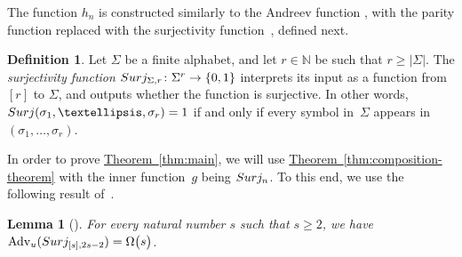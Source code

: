 \documentclass[11pt]{article}
\numberwithin{equation}{section}
\newtheorem{lemma}[theorem]{Lemma}
\theoremstyle{definition}
\newtheorem{definition}[theorem]{Definition}
\theoremstyle{plain}
\newcommand{\N}{\mathbb N}
\newcommand{\expref}[2]{\hyperref[#2]{#1~\ref{#2}}}
\theoremstyle{definition}\newtheorem{notation}[theorem]{Notation}\theoremstyle{plain}
\renewcommand{\N}{\mathbb{N}}
\newcommand{\surj}{\textup{\textsf{Surj}}}
\newcommand{\Amb}{\mathrm{Adv}_{u}}
\theoremstyle{definition}
\theoremstyle{plain}
\begin{document}
The function $h_{n}$ is constructed similarly to the Andreev function
\cite{A87}, with the parity function replaced with the surjectivity
function~\cite{BM12}, defined next.
\begin{definition}
\label{def:surjectivity}Let $\Sigma$ be a finite alphabet, and let $r\in\N$
be such that $r\ge\left|\Sigma\right|$. The \emph{surjectivity function}
$\surj_{\Sigma,r}\colon\Sigma^{r}\to\{0,1\}$ interprets its input
as a function from $\left[r\right]$ to $\Sigma$, and outputs whether
the function is surjective. In other words, $\surj(\sigma_{1},\ldots,\sigma_{r})=1$
if and only if every symbol in~$\Sigma$ appears in~$(\sigma_{1},\ldots,\sigma_{r})$.
\end{definition}

In order to prove \expref{Theorem}{thm:main}, we will use \expref{Theorem}{thm:composition-theorem}
with the inner function~$g$ being $\surj_{n}$. To this end, we
use the following result of~\cite{BM12}.
\begin{lemma}[\cite{BM12}]
\label{lemma:surj-amb}For every natural number $s$ such that $s\ge2$,
we have $\Amb(\surj_{\left[s\right],2s-2})=\Omega\bigl(s\bigr)$. 
\end{lemma}
\end{document}
